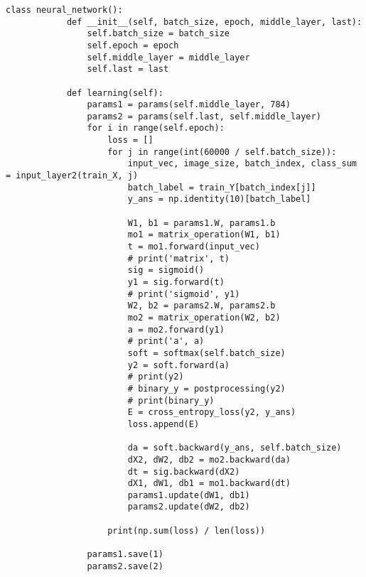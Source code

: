 \documentclass[a4j, titlepage]{jarticle}
\begin{document}
    \subsubsection*{}
        \begin{lstlisting}[caption=ニューラルネットワーク,label=fuga]
        class neural_network():
            def __init__(self, batch_size, epoch, middle_layer, last):
                self.batch_size = batch_size
                self.epoch = epoch
                self.middle_layer = middle_layer
                self.last = last

            def learning(self):
                params1 = params(self.middle_layer, 784)
                params2 = params(self.last, self.middle_layer)
                for i in range(self.epoch):
                    loss = []
                    for j in range(int(60000 / self.batch_size)):
                        input_vec, image_size, batch_index, class_sum = input_layer2(train_X, j)
                        batch_label = train_Y[batch_index[j]]
                        y_ans = np.identity(10)[batch_label]

                        W1, b1 = params1.W, params1.b
                        mo1 = matrix_operation(W1, b1)
                        t = mo1.forward(input_vec)
                        # print('matrix', t)
                        sig = sigmoid()
                        y1 = sig.forward(t)
                        # print('sigmoid', y1)
                        W2, b2 = params2.W, params2.b
                        mo2 = matrix_operation(W2, b2)
                        a = mo2.forward(y1)
                        # print('a', a)
                        soft = softmax(self.batch_size)
                        y2 = soft.forward(a)
                        # print(y2)
                        # binary_y = postprocessing(y2)
                        # print(binary_y)
                        E = cross_entropy_loss(y2, y_ans)
                        loss.append(E)

                        da = soft.backward(y_ans, self.batch_size)
                        dX2, dW2, db2 = mo2.backward(da)
                        dt = sig.backward(dX2)
                        dX1, dW1, db1 = mo1.backward(dt)
                        params1.update(dW1, db1)
                        params2.update(dW2, db2)

                    print(np.sum(loss) / len(loss))

                params1.save(1)
                params2.save(2)


\end{lstlisting}
\end{document}
